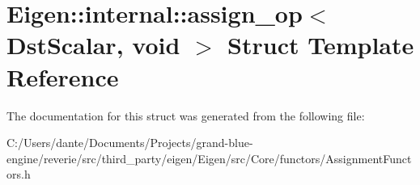 \hypertarget{struct_eigen_1_1internal_1_1assign__op_3_01_dst_scalar_00_01void_01_4}{}\section{Eigen\+::internal\+::assign\+\_\+op$<$ Dst\+Scalar, void $>$ Struct Template Reference}
\label{struct_eigen_1_1internal_1_1assign__op_3_01_dst_scalar_00_01void_01_4}


The documentation for this struct was generated from the following file\+:\begin{DoxyCompactItemize}
\item 
C\+:/\+Users/dante/\+Documents/\+Projects/grand-\/blue-\/engine/reverie/src/third\+\_\+party/eigen/\+Eigen/src/\+Core/functors/Assignment\+Functors.\+h\end{DoxyCompactItemize}
